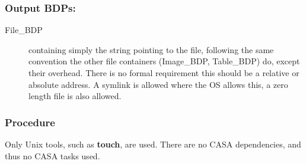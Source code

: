 \subsubsection{Output BDPs:}

\begin{description}
\item[File\_BDP] containing simply the string pointing to the
  file, following the same convention the other file containers
(Image\_BDP, Table\_BDP) do, except their overhead.
There is no formal requirement this should be a relative or absolute
address. A symlink is allowed where the OS allows this, a zero length
file is also allowed.
\end{description}

\subsubsection{Procedure}

Only Unix tools, such as {\bf touch}, are used.
There are no CASA dependencies, and thus no CASA tasks used.



\clearpage
